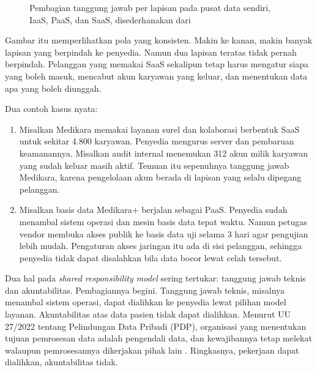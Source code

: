 \begin{figure}[!htb]
  \centering
  
  \caption{Pembagian tanggung jawab per lapisan pada pusat data sendiri, IaaS, PaaS, dan
           SaaS, disederhanakan dari \cite{c02-azure-shared}}
  \label{fig:ch02-tanggung-jawab}
\end{figure}

Gambar itu memperlihatkan pola yang konsisten. Makin ke kanan, makin banyak lapisan yang
berpindah ke penyedia. Namun dua lapisan teratas tidak pernah berpindah. Pelanggan yang
memakai SaaS sekalipun tetap harus mengatur siapa yang boleh masuk, mencabut akun karyawan
yang keluar, dan menentukan data apa yang boleh diunggah.

Dua contoh kasus nyata:
\begin{enumerate}
  \item Misalkan Medikara memakai layanan surel dan kolaborasi berbentuk SaaS untuk sekitar
        4.800 karyawan. Penyedia mengurus server dan pembaruan keamanannya. Misalkan audit
        internal menemukan 312 akun milik karyawan yang sudah keluar masih aktif. Temuan itu
        sepenuhnya tanggung jawab Medikara, karena pengelolaan akun berada di lapisan yang
        selalu dipegang pelanggan.
  \item Misalkan basis data Medikara+ berjalan sebagai PaaS. Penyedia sudah menambal sistem
        operasi dan mesin basis data tepat waktu. Namun petugas vendor membuka akses publik
        ke basis data uji selama 3 hari agar pengujian lebih mudah. Pengaturan akses
        jaringan itu ada di sisi pelanggan, sehingga penyedia tidak dapat disalahkan bila
        data bocor lewat celah tersebut.
\end{enumerate}

Dua hal pada \textit{shared responsibility model} sering tertukar: tanggung jawab teknis dan
akuntabilitas. Pembagiannya begini. Tanggung jawab teknis, misalnya menambal sistem operasi,
dapat dialihkan ke penyedia lewat pilihan model layanan. Akuntabilitas atas data pasien
tidak dapat dialihkan. Menurut UU 27/2022 tentang Pelindungan Data Pribadi (PDP), organisasi
yang menentukan tujuan pemrosesan data adalah pengendali data, dan kewajibannya tetap
melekat walaupun pemrosesannya dikerjakan pihak lain \cite{uu27-2022-pdp}. Ringkasnya,
pekerjaan dapat dialihkan, akuntabilitas tidak.


